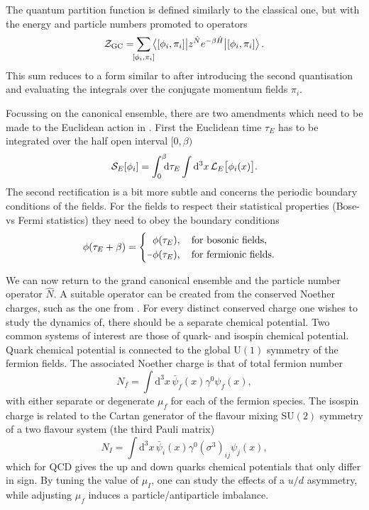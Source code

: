 The quantum partition function is defined similarly to the classical one, but with
the energy and particle numbers promoted to operators
%
\begin{equation}
  \mathcal{Z}_{\text{GC}} = \sum_{\mathclap{[\phi_i, \pi_i]}}
  \big\langle [\phi_i, \pi_i] \big|
    z^{\hat{N}} e^{-\beta \hat{H}} \big| [\phi_i, \pi_i] \big\rangle \,.
\end{equation}
%
This sum reduces to a form similar to  after introducing
the second quantisation and evaluating the integrals over the conjugate momentum
fields $\pi_i$.

Focussing on the canonical ensemble, there are two amendments which need to be
made to the Euclidean action in . First the Euclidean time
$\tau_E$ has to be integrated over the half open interval $[0, \beta)$
%
\begin{equation}
  \mathcal{S}_E[\phi_i] = \int_{\mathrlap{0}}^{\mathrlap{\beta}} \mathrm{d} \tau_E \int \mathrm{d}^3 x \,
    \mathcal{L}_E\big[\phi_i(x)\big].
\end{equation}
%
The second rectification is a bit more subtle and concerns the periodic boundary
conditions of the fields. For the fields to respect their statistical properties
(Bose- vs Fermi statistics) they need to obey the boundary conditions
%
\begin{equation} \label{eq:boundary-conditions}
  \phi(\tau_E + \beta) = \begin{cases}
    \hphantom{\minus}\phi(\tau_E), \hskip1em \text{for bosonic fields}, \\
    \minus\phi(\tau_E), \hskip1em \text{for fermionic fields}.
  \end{cases}
\end{equation}

We can now return to the grand canonical ensemble and the particle number
operator $\hat{N}$. A suitable operator can be created from the conserved
Noether charges, such as the one from . For every
distinct conserved charge one wishes to study the dynamics of, there should be a
separate chemical potential. Two common systems of interest are those of quark-
and isospin chemical potential. Quark chemical potential is connected to the
global U$(1)$ symmetry of the fermion fields. The associated Noether charge is
that of total fermion number
%
\begin{equation} \label{eq:quark-number-density-op}
  N_f = \int \mathrm{d}^3 x \, \bar{\psi}_f(x) \gamma^0 \psi_f(x),
\end{equation}
%
with either separate or degenerate $\mu_f$ for each of the fermion species. The
isospin charge is related to the Cartan generator of the flavour mixing SU$(2)$
symmetry of a two flavour system (the third Pauli matrix)
%
\begin{equation}
  N_I  = \int \mathrm{d}^3 x \, \bar{\psi}_i(x) \gamma^0 (\sigma^3)_{ij}
    \psi_j(x),
\end{equation}
%
which for QCD gives the up and down quarks chemical potentials that only differ
in sign. By tuning the value of $\mu_I$, one can study the effects of a $u/d$
asymmetry, while adjusting $\mu_f$ induces a particle/antiparticle imbalance.

